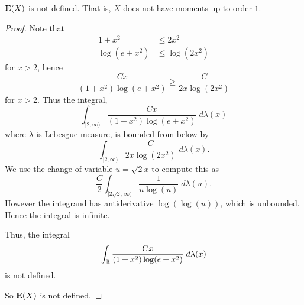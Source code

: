 \documentclass{unswmaths}
\begin{document}
\begin{lemma}
    ${\rm I\kern-.3em E}(X)$ is not defined. That is, $X$ does not have moments up
    to order $1$.
\end{lemma}
\begin{proof}
    Note that
    \begin{align*}
        1+x^2 &\leq 2x^2\\
        \log(e+x^2) &\leq \log(2x^2)
    \end{align*}
    for $x>2$, hence
    \begin{equation*}
        \frac{Cx}{(1+x^2)\log(e+x^2)} \geq \frac{C}{2x\log(2x^2)}
    \end{equation*}
    for $x > 2$. Thus the integral,
    \begin{equation*}
        \int_{[2,\infty)} \frac{Cx}{(1+x^2)\log(e+x^2)}\;d\lambda(x)
    \end{equation*}
    where $\lambda$ is Lebesgue measure, is bounded from below by
    \begin{equation*}
        \int_{[2,\infty)} \frac{C}{2x\log(2x^2)}\;d\lambda(x).
    \end{equation*}
    We use the change of variable $u = \sqrt{2}x$ to compute this as
    \begin{equation*}
        \frac{C}{2}\int_{[2\sqrt{2},\infty)} \frac{1}{u\log(u)}\;d\lambda(u).
    \end{equation*} 
    However the integrand has antiderivative $\log(\log(u))$, which is unbounded.
    Hence the integral is infinite.
    
    Thus, the integral
    \begin{equation*}
        \int_{\mathbb{R}} \frac{Cx}{(1+x^2)\log(e+x^2)}\;d\lambda(x)
    \end{equation*}
    is not defined.
    
    So ${\rm I\kern-.3em E}(X)$ is not defined.
\end{proof}
    
\end{document}
